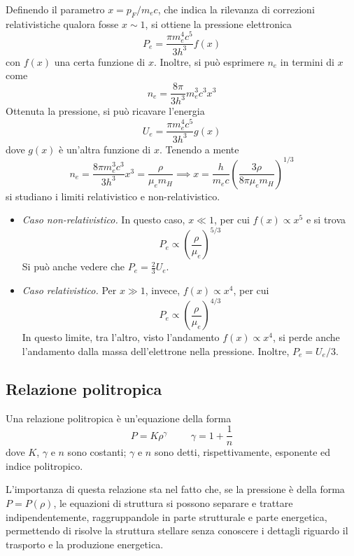 \documentclass[11pt, a4paper]{scrartcl}
\theoremstyle{style}
\theoremstyle{style1}
\numberwithin{equation}{subsection}
\begin{document}
Definendo il parametro $x = p_F / m_e c$, che indica la rilevanza di correzioni relativistiche qualora fosse $x\sim 1$, si ottiene la pressione elettronica 
\[
P_e = \frac{\pi m_e^4 c^5}{3 h^3}f(x)
\] 
con $f(x)$ una certa funzione di $x$.
Inoltre, si pu\`o esprimere $n_e$ in termini di $x$ come 
\[
n_e = \frac{8 \pi }{3 h^3} m_e ^3 c^3 x^3
\] 
Ottenuta la pressione, si pu\`o ricavare l'energia
\[
U_e = \frac{\pi m_e ^4 c^5}{3 h^3} g(x)
\] 
dove $g(x)$ \`e un'altra funzione di $x$.
Tenendo a mente
\[
n_e = \frac{8 \pi m_e^3 c^3}{3 h ^3} x^3 = \frac{\rho }{\mu _e m_H} \implies x =\frac{h}{m_ec} \left(\frac{3\rho }{8\pi\mu _e m_H}\right)^{1 / 3}
\] 
si studiano i limiti relativistico e non-relativistico.
\begin{itemize}
	\item \textit{Caso non-relativistico.} 
		In questo caso, $x\ll 1$, per cui $f(x) \propto x^5$ e si trova 
		\[
		P_e \propto \left(\frac{\rho }{\mu _e}\right) ^{5 / 3}
		\] 
		Si pu\`o anche vedere che $P_e = \frac{2}{3}U_e$.
	\item \textit{Caso relativistico.}	
		Per $x \gg 1$, invece, $f(x) \propto x^4$, per cui 
		\[
		P_e \propto \left(\frac{\rho }{\mu _e}\right) ^{4 / 3}
		\] 
		In questo limite, tra l'altro, visto l'andamento $f(x) \propto x^4$, si perde anche l'andamento dalla massa dell'elettrone nella pressione.
		Inoltre, $P_e = U_e / 3$.
\end{itemize}
\subsection{Relazione politropica}

Una relazione politropica \`e un'equazione della forma 
\[
P = K \rho ^\gamma \hspace{1cm} \gamma = 1 + \frac{1}{n}
\] 
dove $K$, $\gamma$ e $n$ sono costanti; $\gamma$ e $n$ sono detti, rispettivamente, esponente ed indice politropico.

L'importanza di questa relazione sta nel fatto che, se la pressione \`e della forma $P= P(\rho )$, le equazioni di struttura si possono separare e trattare indipendentemente, raggruppandole in parte strutturale e parte energetica, permettendo di risolve la struttura stellare senza conoscere i dettagli riguardo il trasporto e la produzione energetica.
\end{document}
